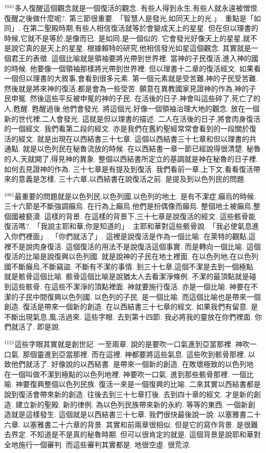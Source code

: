 \documentclass{book}
\begin{document}
$^{1041}$多人復醒這個觀念就是一個復活的觀念.
有些人得到永生,有些人就永遠被憎恨.
復醒之後做什麼呢?.
第三節很重要.
「智慧人是發光,如同天上的光.」.
重點是「如同」.
在第二聖殿時期,有些人相信復活就等於會變成天上的星星.
但在但以理書的時候,它就不是等於,是像而已.
是如同,是一個似的.
它會發光好像天上的星星,就不是說它真的是天上的星星.
根據賴特的研究,他相信發光如星這個觀念.
其實就是一個君王的表徵.
這個比喻就是領袖要將光帶到世界裡.
當神的子民復活,進入神的國的時候.
他要像一個領袖那樣將光帶到世界裡.
但以理書十二章的復活經文.
如果看一個但以理書的大敘事,會看到很多元素.
第一個元素就是受苦難,神的子民受苦難.
然後就是將來神的復活,都是會為一些受苦.
願意在異教國家見證神的作為,神的子民申冤.
然後這些平反被申冤的神的子民.
在活後的日子,神會叫這些碎了,死亡了的人,甦醒.
甦醒過後,他們會發光.
將這個光,好像一個領袖治理大地的觀念.
放在一個新的世代裡,二人會發光.
這就是但以理書的描述.
二人在活後的日子,將會肉身復活的一個經文.
我們看第二段的經文.
亦是我們在舊約聖經常常會看到的一段關於復活的經文.
就是出現在以西結書三十七章.
這個以西結書三十七章和但以理書的共通點.
就是以色列民在秘魯流放的時候.
在以西結書一章一節已經說得很清楚.
秘魯的人,天就開了,得見神的異象.
整個以西結書所定立的基調就是神在秘魯的日子裡.
如何去見證神的作為.
三十七章是有提及到復活.
我們看前一章,上下文,看看復活帶來的意義是怎樣.
三十六章,以西結書在說復活之前.
是提及到以色列民的問題.

$^{1081}$最重要的問題就是以色列民,以色列國,以色列的地土.
是有不潔症,癲烏的時候.
三十六節是不斷強調癲烏.
在行為上癲烏,他們是扮偶像而癲烏.
整個地土被癲烏,整個國被褻瀆.
這樣的背景.
在這樣的背景下,三十七章是說復活的經文.
這些骸骨能復活嗎?.
「我說主耶和華,你是知道的」.
主耶和華對這些骸骨說.
「我必使氣息進入你們裡面」.
「你們就活了」.
這裡是說復活是作為一個比喻.
在萊特的觀點,這裡不是說肉身復活.
這個復活的用法不是說復活這個事實.
而是轉向一個比喻.
這個復活的比喻是說復興以色列國.
就是說神的子民在地土裡面.
在以色列地,在以色列國不斷癲烏,不斷竊盜.
不斷有不潔的事情.
到三十七章,這個不潔是去到一個極點.
就是骸骨這個比喻.
骸骨這個比喻是說猶太人去看潔淨條例.
不潔的最頂點就是碰到這些骸骨.
在這些不潔淨的頂點裡面.
神就要施行復活.
亦是一個比喻.
神要在不潔的子民中間復興以色列國.
以色列的子民.
是一個比喻.
而這個比喻也是帶來一個創造.
復活是帶來一個新的創造.
在以西結書三十七章的經文.
如果我們有留意.
是不斷出現氣息,風,活過來.
這些字眼.
去到第十四節.
我必將我的靈放在你們裡面.
你們就活了.
即是說.

$^{1121}$這些字眼其實就是創世記.
一至兩章.
說的是要吹一口氣進到亞當那裡.
神吹一口氣.
那個靈進到亞當那裡.
而在這裡.
神都要將這些氣息.
這些吹到骸骨那裡.
以致他們就活了.
好像說的以西結書.
是帶來一個新的創造.
在敗壞極致的以色列地.
在一個叫做不潔到極點的以色列地裡.
神要吹一口氣.
進到那些骸骨那裡.
一個比喻.
神要復興整個以色列民族.
復活一來是一個復興的比喻.
二來其實以西結書都是說到復活會帶來新的創造.
往後去到三十七章打後.
去到四十章的經文.
才是新的創造.
建立新的聖殿.
新的律例.
為以色列民族帶來新的永約.
等等的東西.
一個新創造就是這樣發生.
這個就是以西結書三十七章.
我們很快最後說一說.
以塞雅書二十六章.
以塞雅書二十六章的背景.
其實和前兩章很相似.
但是它的寫作背景.
是很難去界定.
不知道是不是真的秘魯時期.
但可以很肯定的就是.
這個背景是說耶和華對全地施行一個審判.
而這些審判其實都是.
地很空虛.
很荒涼.
\end{document}
